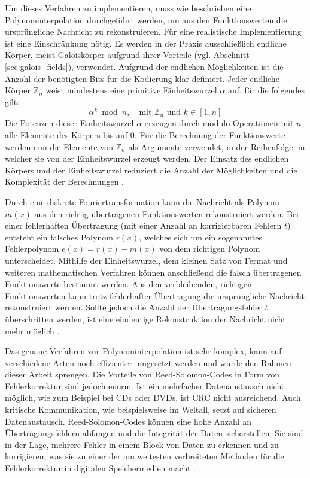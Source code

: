 Um dieses Verfahren zu implementieren, muss wie beschrieben eine Polynominterpolation durchgeführt werden, um aus den Funktionswerten die ursprüngliche Nachricht zu rekonstruieren. Für eine realistische Implementierung ist eine Einschränkung nötig. Es werden in der Praxis ausschließlich endliche Körper, meist Galoiskörper aufgrund ihrer Vorteile (vgl. Abschnitt \ref{sec:galois_fields}), verwendet. Aufgrund der endlichen Möglichkeiten ist die Anzahl der benötigten Bits für die Kodierung klar definiert. Jeder endliche Körper \(\mathbb{Z}_n\) weist mindestens eine primitive Einheitswurzel \(\alpha\) auf, für die folgendes gilt:
\begin{equation}
    \label{eq:primitive_einheitswurzel}
    \alpha^k \bmod n, \quad \text{mit } \mathbb{Z}_n \text{ und } k \in [1, n]
\end{equation}
Die Potenzen dieser Einheitswurzel \(\alpha\) erzeugen durch modulo-Operationen mit \(n\) alle Elemente des Körpers bis auf \(0\). Für die Berechnung der Funktionswerte werden nun die Elemente von $\mathbb{Z}_n$ als Argumente verwendet, in der Reihenfolge, in welcher sie von der Einheitswurzel erzeugt werden. Der Einsatz des endlichen Körpers und der Einheitswurzel reduziert die Anzahl der Möglichkeiten und die Komplexität der Berechnungen \cite{Springer_RS}.

Durch eine diskrete Fouriertransformation kann die Nachricht als Polynom \(m(x)\) aus den richtig übertragenen Funktionswerten rekonstruiert werden. Bei einer fehlerhaften Übertragung (mit einer Anzahl an korrigierbaren Fehlern \(t\)) entsteht ein falsches Polynom \(r(x)\), welches sich um ein sogenanntes Fehlerpolynom \(e(x) = r(x) - m(x)\) von dem richtigen Polynom unterscheidet. Mithilfe der Einheitswurzel, dem kleinen Satz von Fermat und weiteren mathematischen Verfahren können anschließend die falsch übertragenen Funktionswerte bestimmt werden. Aus den verbleibenden, richtigen Funktionswerten kann trotz fehlerhafter Übertragung die ursprüngliche Nachricht rekonstruiert werden. Sollte jedoch die Anzahl der Übertragungsfehler \(t\) überschritten werden, ist eine eindeutige Rekonstruktion der Nachricht nicht mehr möglich \cite{Springer_RS}.

Das genaue Verfahren zur Polynominterpolation ist sehr komplex, kann auf verschiedene Arten noch effizienter umgesetzt werden und würde den Rahmen dieser Arbeit sprengen. Die Vorteile von Reed-Solomon-Codes in Form von Fehlerkorrektur sind jedoch enorm. Ist ein mehrfacher Datenaustausch nicht möglich, wie zum Beispiel bei CDs oder DVDs, ist \ac{CRC} nicht ausreichend. Auch kritische Kommunikation, wie beispielsweise im Weltall, setzt auf sicheren Datenaustausch. Reed-Solomon-Codes können eine hohe Anzahl an Übertragungsfehlern abfangen und die Integrität der Daten sicherstellen. Sie sind in der Lage, mehrere Fehler in einem Block von Daten zu erkennen und zu korrigieren, was sie zu einer der am weitesten verbreiteten Methoden für die Fehlerkorrektur in digitalen Speichermedien macht \cite{Springer_RS}.
